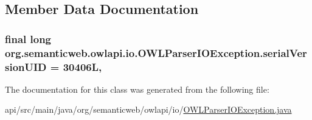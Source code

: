 \subsection{Member Data Documentation}
\hypertarget{classorg_1_1semanticweb_1_1owlapi_1_1io_1_1_o_w_l_parser_i_o_exception_ad26acad7b69c99f8b815e63799a3d98b}{
\subsubsection[{serial\-Version\-U\-I\-D}]{\setlength{\rightskip}{0pt plus 5cm}final long org.\-semanticweb.\-owlapi.\-io.\-O\-W\-L\-Parser\-I\-O\-Exception.\-serial\-Version\-U\-I\-D = 30406\-L\hspace{0.3cm}{\ttfamily [static]}, {\ttfamily [private]}}}\label{classorg_1_1semanticweb_1_1owlapi_1_1io_1_1_o_w_l_parser_i_o_exception_ad26acad7b69c99f8b815e63799a3d98b}


The documentation for this class was generated from the following file\-:\begin{DoxyCompactItemize}
\item 
api/src/main/java/org/semanticweb/owlapi/io/\hyperlink{_o_w_l_parser_i_o_exception_8java}{O\-W\-L\-Parser\-I\-O\-Exception.\-java}\end{DoxyCompactItemize}
